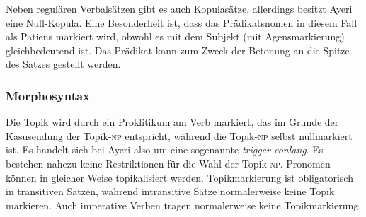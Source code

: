 \documentclass[
	12pt,
	ngerman,
]{scrartcl}
\let\q\textquote
\newcommand{\fw}[1]{\textit{#1}} %
\newcommand{\zwsp}{\mbox{​}} %
\newcommand{\rayr}[2]{\zwsp\smash{{\Tagati #1}} \emph{#2}} %
\begin{document}

Neben regulären Verbalsätzen gibt es auch Kopulasätze, allerdings besitzt Ayeri
eine Null-Kopula. Eine Besonderheit ist, dass das Prädikatsnomen in diesem Fall
als Patiens markiert wird, obwohl es mit dem Subjekt (mit Agensmarkierung)
gleichbedeutend ist. Das Prädikat kann zum Zweck der Betonung an die Spitze des
Satzes gestellt werden.



\subsubsection{Morphosyntax}
\label{subsubsec:morphsyn}

Die Topik wird durch ein Proklitikum am Verb markiert, das im Grunde der
Kasusendung der Topik-\textsc{np} entspricht, während die Topik-\textsc{np}
selbst nullmarkiert ist. Es handelt sich bei Ayeri also um eine sogenannte
\fw{trigger conlang}. Es bestehen nahezu keine Restriktionen für die Wahl der
Topik-\textsc{np}. Pronomen können in gleicher Weise topikalisiert werden.
Topikmarkierung ist obligatorisch in transitiven Sätzen, während intransitive
Sätze normalerweise keine Topik markieren. Auch imperative Verben tragen
normalerweise keine Topikmarkierung.

\end{document}
